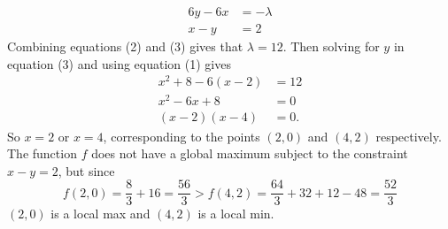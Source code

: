 \documentclass[12 pt]{article}
\begin{document}
\begin{enumerate}
\begin{align}
			6y - 6x &= -\lambda \\
			x - y &= 2
		\end{align}
		Combining equations (2) and (3) gives that $\lambda = 12$.
		Then solving for $y$ in equation (3) and using equation (1) gives
		\begin{align*}
			x^2 + 8 - 6(x-2) &= 12 \\
			x^2 - 6x + 8 &= 0 \\
			(x - 2)(x - 4) &= 0.
		\end{align*}
		So $x = 2$ or $x = 4$, corresponding to the points $(2, 0)$ and $(4, 2)$
		respectively. The function $f$ does not have a global maximum subject to
		the constraint $x - y = 2$, but since \[
		f(2, 0) = \frac 83 + 16 = \frac{56}{3} > f(4, 2) = \frac{64}{3} + 32 + 12 - 48 = \frac{52}{3}\]
		$(2, 0)$ is a local max and $(4, 2)$ is a local min.
  \end{enumerate}
\end{document}
